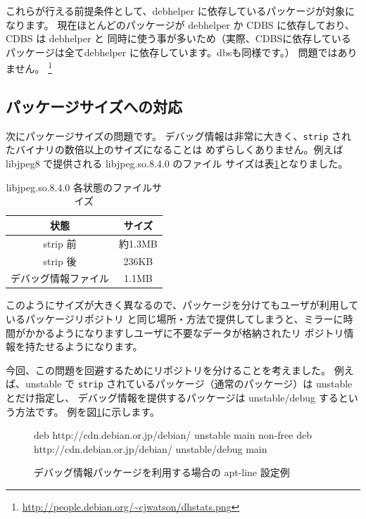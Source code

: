 \documentclass[mingoth,a4paper]{jsarticle}
\begin{document}
これらが行える前提条件として、debhelper に依存しているパッケージが対象になります。
現在ほとんどのパッケージが debhelper か CDBS に依存しており、CDBS は debhelper と
同時に使う事が多いため（実際、CDBSに依存しているパッケージは全てdebhelper に依存しています。dbsも同様です。）
問題ではありません。
\footnote{\url{http://people.debian.org/~cjwatson/dhstats.png}}

\subsection{パッケージサイズへの対応}

次にパッケージサイズの問題です。
デバッグ情報は非常に大きく、\texttt{strip} されたバイナリの数倍以上のサイズになることは
めずらしくありません。例えば libjpeg8 で提供される libjpeg.so.8.4.0 のファイル
サイズは表\ref{tab:debuginfo-jpegsize}となりました。

\begin{table}[ht]
 \caption{libjpeg.so.8.4.0 各状態のファイルサイズ}
 \label{tab:debuginfo-jpegsize}
\begin{center}
  \begin{tabular}{|c|c|}
 \hline
 状態 & サイズ \\
 \hline
 strip 前 & 約1.3MB \\
 strip 後 & 236KB \\
 デバッグ情報ファイル & 1.1MB \\
 \hline
 \end{tabular}
\end{center}
\end{table}

このようにサイズが大きく異なるので、パッケージを分けてもユーザが利用しているパッケージリポジトリ
と同じ場所・方法で提供してしまうと、ミラーに時間がかかるようになりますしユーザに不要なデータが格納されたリ
ポジトリ情報を持たせるようになります。

今回、この問題を回避するためにリポジトリを分けることを考えました。
例えば、unstable で \texttt{strip} されているパッケージ（通常のパッケージ）は unstable とだけ指定し、
デバッグ情報を提供するパッケージは unstable/debug するという方法です。
例を図\ref{fig:debuginfo-apt-line}に示します。

\begin{figure}[ht]
\begin{center}
\begin{commandline}
deb http://cdn.debian.or.jp/debian/ unstable main non-free
deb http://cdn.debian.or.jp/debian/ unstable/debug main
\end{commandline}
\end{center}
 \caption{デバッグ情報パッケージを利用する場合の apt-line 設定例}
 \label{fig:debuginfo-apt-line}
\end{figure}
\end{document}
